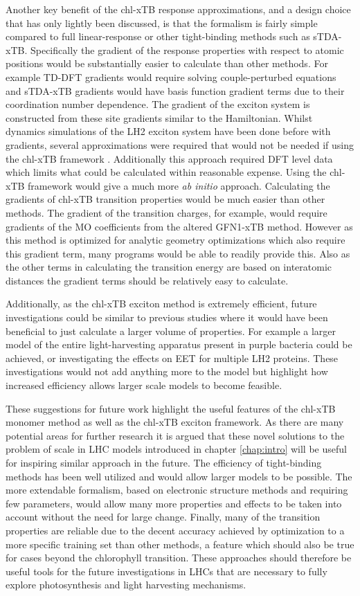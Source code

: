 Another key benefit of the chl-xTB response approximations, and a design choice 
that has only lightly been discussed, is that the formalism is fairly simple compared 
to full linear-response or other tight-binding methods such as sTDA-xTB. Specifically
the gradient of the response properties with respect to atomic positions would be
substantially easier to calculate than other methods. For example TD-DFT gradients 
would require solving couple-perturbed equations and sTDA-xTB gradients would have 
basis function gradient terms due to their coordination number dependence. The gradient
of the exciton system is constructed from these site gradients similar to the Hamiltonian.
Whilst dynamics simulations of the LH2 exciton system have been done before with
gradients, several approximations were required that would not be needed if using
the chl-xTB framework \cite{Sisto2017}. Additionally this approach required DFT 
level data which limits what could be calculated within reasonable expense. Using 
the chl-xTB framework would give a much more \emph{ab initio} approach. Calculating 
the gradients of chl-xTB transition properties would be much easier than other methods.
The gradient of the transition charges, for example, would require gradients of 
the MO coefficients from the altered GFN1-xTB method. However as this method is 
optimized for analytic geometry optimizations which also require this gradient term,
many programs would be able to readily provide this. Also as the other terms in 
calculating the transition energy are based on interatomic distances the gradient 
terms should be relatively easy to calculate.

Additionally, as the chl-xTB exciton method is extremely efficient, future investigations
could be similar to previous studies where it would have been beneficial to just 
calculate a larger volume of properties. For example a larger model of the entire
light-harvesting apparatus present in purple bacteria could be achieved, or investigating
the effects on EET for multiple LH2 proteins. These investigations would not add
anything more to the model but highlight how increased efficiency allows larger
scale models to become feasible.

These suggestions for future work highlight the useful features of the chl-xTB monomer
method as well as the chl-xTB exciton framework. As there are many potential areas
for further research it is argued that these novel solutions to the problem of scale
in LHC models introduced in chapter \ref{chap:intro} will be useful for inspiring
similar approach in the future. The efficiency of tight-binding methods has been
well utilized and would allow larger models to be possible. The more extendable
formalism, based on electronic structure methods and requiring few parameters, would
allow many more properties and effects to be taken into account without the need
for large change. Finally, many of the transition properties are reliable due to
the decent accuracy achieved by optimization to a more specific training set than
other methods, a feature which should also be true for cases beyond the \Qy chlorophyll
transition. These approaches should therefore be useful tools for the future investigations
in LHCs that are necessary to fully explore photosynthesis and light harvesting
mechanisms. 